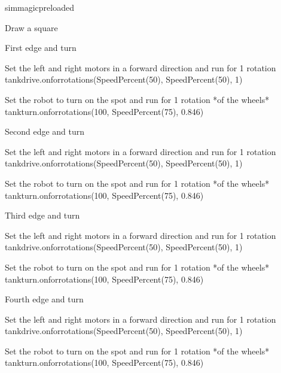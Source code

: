 \documentclass[letterpaper,10pt,english]{sphinxmanual}
\begin{document}
{
\begin{sphinxVerbatim}[commandchars=\\\{\}]
\llap{\color{nbsphinxin}[ ]:\,\hspace{\fboxrule}\hspace{\fboxsep}}\PYGZpc{}\PYGZpc{}sim\PYGZus{}magic\PYGZus{}preloaded

\PYGZsh{} Draw a square


\PYGZsh{} First edge and turn

\PYGZsh{} Set the left and right motors in a forward direction
\PYGZsh{} and run for 1 rotation
tank\PYGZus{}drive.on\PYGZus{}for\PYGZus{}rotations(SpeedPercent(50), SpeedPercent(50), 1)

\PYGZsh{} Set the robot to turn on the spot
\PYGZsh{} and run for 1 rotation *of the wheels*
tank\PYGZus{}turn.on\PYGZus{}for\PYGZus{}rotations(\PYGZhy{}100, SpeedPercent(75), 0.846)



\PYGZsh{} Second edge and turn

\PYGZsh{} Set the left and right motors in a forward direction
\PYGZsh{} and run for 1 rotation
tank\PYGZus{}drive.on\PYGZus{}for\PYGZus{}rotations(SpeedPercent(50), SpeedPercent(50), 1)


\PYGZsh{} Set the robot to turn on the spot
\PYGZsh{} and run for 1 rotation *of the wheels*
tank\PYGZus{}turn.on\PYGZus{}for\PYGZus{}rotations(\PYGZhy{}100, SpeedPercent(75), 0.846)


\PYGZsh{} Third edge and turn

\PYGZsh{} Set the left and right motors in a forward direction
\PYGZsh{} and run for 1 rotation
tank\PYGZus{}drive.on\PYGZus{}for\PYGZus{}rotations(SpeedPercent(50), SpeedPercent(50), 1)

\PYGZsh{} Set the robot to turn on the spot
\PYGZsh{} and run for 1 rotation *of the wheels*
tank\PYGZus{}turn.on\PYGZus{}for\PYGZus{}rotations(\PYGZhy{}100, SpeedPercent(75), 0.846)



\PYGZsh{} Fourth edge and turn

\PYGZsh{} Set the left and right motors in a forward direction
\PYGZsh{} and run for 1 rotation
tank\PYGZus{}drive.on\PYGZus{}for\PYGZus{}rotations(SpeedPercent(50), SpeedPercent(50), 1)


\PYGZsh{} Set the robot to turn on the spot
\PYGZsh{} and run for 1 rotation *of the wheels*
tank\PYGZus{}turn.on\PYGZus{}for\PYGZus{}rotations(\PYGZhy{}100, SpeedPercent(75), 0.846)
\end{sphinxVerbatim}
}
\end{document}

